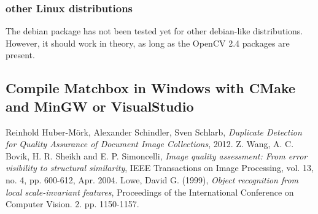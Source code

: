 \documentclass{hitec}
\begin{document}
\subsubsection*{other Linux distributions}
The debian package has not been tested yet for other debian-like distributions.
However, it should work in theory, as long as the OpenCV 2.4 packages are present.

\subsection{Compile Matchbox in Windows with CMake and MinGW or VisualStudio}



\begin{thebibliography}{9}
  Reinhold Huber-M\"ork, Alexander Schindler, Sven Schlarb, 
  \emph{Duplicate Detection for Quality Assurance of Document Image Collections}, 
  2012.
	Z. Wang, A. C. Bovik, H. R. Sheikh and E. P. Simoncelli, 
	\emph{Image quality assessment: From error visibility to structural similarity}, 
	IEEE Transactions on Image Processing, vol. 13, no. 4, pp. 600-612, Apr. 2004.
	Lowe, David G. (1999), 
	\emph{Object recognition from local scale-invariant features}, 
	Proceedings of the International Conference on Computer Vision. 2. pp. 1150-1157. 
\end{thebibliography}
\end{document}
